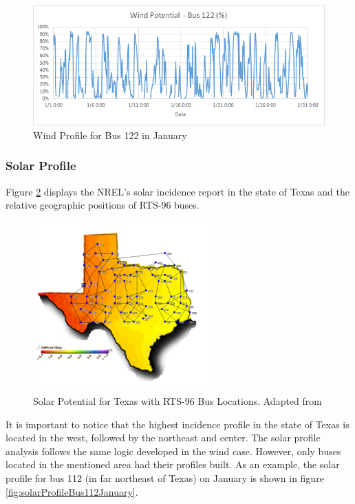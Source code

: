 \documentclass[12pt,LUDisStyle,twosided]{book}
\begin{document}
\begin{figure}[H] 
  \includegraphics[width=\textwidth,keepaspectratio]{windPotentialBus122.png}
  \caption{Wind Profile for Bus 122 in January}
  \label{fig:windProfileBus122January}
\end{figure}

\newpage
\subsubsection{Solar Profile}

Figure \ref{fig:texasSolarProfile} displays the NREL's solar incidence report in the state of Texas and the relative geographic positions of RTS-96 buses. 

\begin{figure}[H] 
	\begin{center}
		\includegraphics[width=0.6\textwidth,height=\textheight,keepaspectratio]{texasSolarProfileWithBuses.png}
	  	\caption{Solar Potential for Texas with RTS-96 Bus Locations. Adapted from \cite{texasSolarProfile} }	  		\label{fig:texasSolarProfile}
	\end{center}
\end{figure}


It is important to notice that the highest incidence profile in the state of Texas is located in the west, followed by the northeast and center. The solar profile analysis follows the same logic developed in the wind case. However, only buses located in the mentioned area had their profiles built. As an example, the solar profile for bus 112 (in far northeast of Texas) on January is shown in figure \ref{fig:solarProfileBus112January}.
\end{document}
